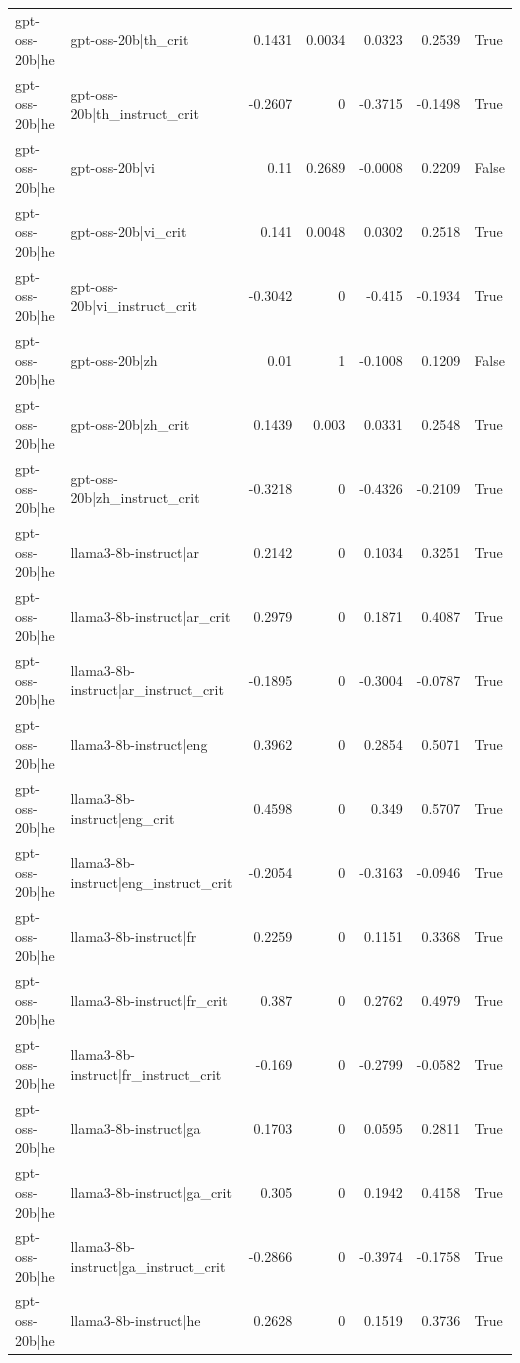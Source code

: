 \begin{table}
\begin{tabular}{l l r r r r l}
gpt-oss-20b|he & gpt-oss-20b|th_crit & 0.1431 & 0.0034 & 0.0323 & 0.2539 & True \\
gpt-oss-20b|he & gpt-oss-20b|th_instruct_crit & -0.2607 & 0 & -0.3715 & -0.1498 & True \\
gpt-oss-20b|he & gpt-oss-20b|vi & 0.11 & 0.2689 & -0.0008 & 0.2209 & False \\
gpt-oss-20b|he & gpt-oss-20b|vi_crit & 0.141 & 0.0048 & 0.0302 & 0.2518 & True \\
gpt-oss-20b|he & gpt-oss-20b|vi_instruct_crit & -0.3042 & 0 & -0.415 & -0.1934 & True \\
gpt-oss-20b|he & gpt-oss-20b|zh & 0.01 & 1 & -0.1008 & 0.1209 & False \\
gpt-oss-20b|he & gpt-oss-20b|zh_crit & 0.1439 & 0.003 & 0.0331 & 0.2548 & True \\
gpt-oss-20b|he & gpt-oss-20b|zh_instruct_crit & -0.3218 & 0 & -0.4326 & -0.2109 & True \\
gpt-oss-20b|he & llama3-8b-instruct|ar & 0.2142 & 0 & 0.1034 & 0.3251 & True \\
gpt-oss-20b|he & llama3-8b-instruct|ar_crit & 0.2979 & 0 & 0.1871 & 0.4087 & True \\
gpt-oss-20b|he & llama3-8b-instruct|ar_instruct_crit & -0.1895 & 0 & -0.3004 & -0.0787 & True \\
gpt-oss-20b|he & llama3-8b-instruct|eng & 0.3962 & 0 & 0.2854 & 0.5071 & True \\
gpt-oss-20b|he & llama3-8b-instruct|eng_crit & 0.4598 & 0 & 0.349 & 0.5707 & True \\
gpt-oss-20b|he & llama3-8b-instruct|eng_instruct_crit & -0.2054 & 0 & -0.3163 & -0.0946 & True \\
gpt-oss-20b|he & llama3-8b-instruct|fr & 0.2259 & 0 & 0.1151 & 0.3368 & True \\
gpt-oss-20b|he & llama3-8b-instruct|fr_crit & 0.387 & 0 & 0.2762 & 0.4979 & True \\
gpt-oss-20b|he & llama3-8b-instruct|fr_instruct_crit & -0.169 & 0 & -0.2799 & -0.0582 & True \\
gpt-oss-20b|he & llama3-8b-instruct|ga & 0.1703 & 0 & 0.0595 & 0.2811 & True \\
gpt-oss-20b|he & llama3-8b-instruct|ga_crit & 0.305 & 0 & 0.1942 & 0.4158 & True \\
gpt-oss-20b|he & llama3-8b-instruct|ga_instruct_crit & -0.2866 & 0 & -0.3974 & -0.1758 & True \\
gpt-oss-20b|he & llama3-8b-instruct|he & 0.2628 & 0 & 0.1519 & 0.3736 & True \\

\end{tabular}
\end{table}

